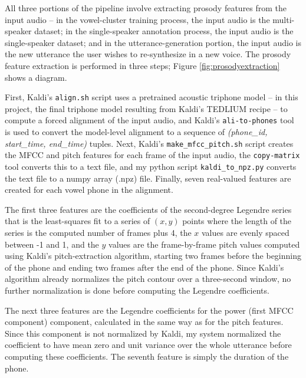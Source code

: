\documentclass{article}
\begin{document}
All three portions of the pipeline involve extracting prosody features from the input audio -- in the vowel-cluster training process, the input audio is the multi-speaker dataset; in the single-speaker annotation process, the input audio is the single-speaker dataset; and in the utterance-generation portion, the input audio is the new utterance the user wishes to re-synthesize in a new voice.
The prosody feature extraction is performed in three steps; Figure \ref{fig:prosodyextraction} shows a diagram.

First, Kaldi's \texttt{align.sh} script uses a pretrained acoustic triphone model -- in this project, the final triphone model resulting from Kaldi's TEDLIUM recipe -- to compute a forced alignment of the input audio, and Kaldi's \texttt{ali-to-phones} tool is used to convert the model-level alignment to a sequence of \textit{(phone\_id, start\_time, end\_time)} tuples.
Next, Kaldi's \texttt{make\_mfcc\_pitch.sh} script creates the MFCC and pitch features for each frame of the input audio, the \texttt{copy-matrix} tool converts this to a text file, and my python script \texttt{kaldi\_to\_npz.py} converts the text file to a numpy array (.npz) file.
Finally, seven real-valued features are created for each vowel phone in the alignment.

The first three features are the coefficients of the second-degree Legendre series that is the least-squares fit to a series of $(x, y)$ points where the length of the series is the computed number of frames plus 4, the $x$ values are evenly spaced between -1 and 1, and the $y$ values are the frame-by-frame pitch values computed using Kaldi's pitch-extraction algorithm, starting two frames before the beginning of the phone and ending two frames after the end of the phone.
Since Kaldi's algorithm already normalizes the pitch contour over a three-second window, no further normalization is done before computing the Legendre coefficients.

The next three features are the Legendre coefficients for the power (first MFCC component) component, calculated in the same way as for the pitch features. Since this component is not normalized by Kaldi, my system normalized the coefficient to have mean zero and unit variance over the whole utterance before computing these coefficients.
The seventh feature is simply the duration of the phone.
\end{document}
